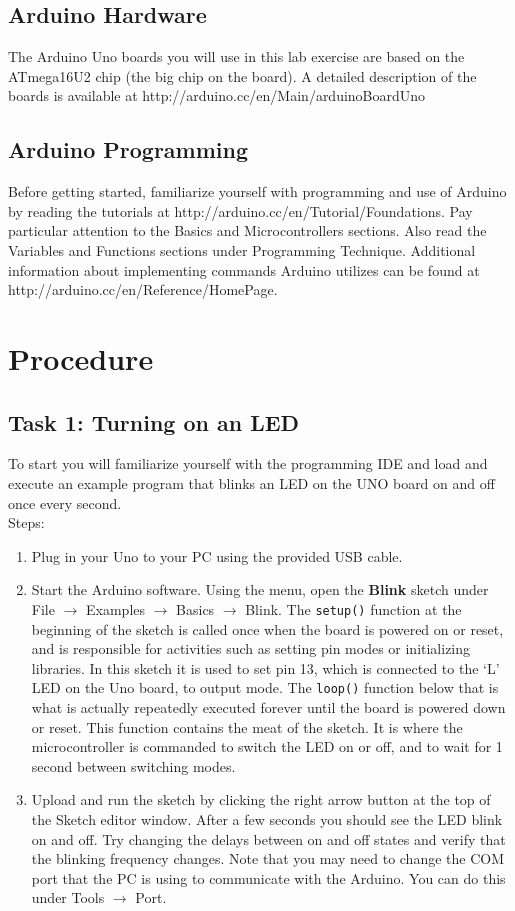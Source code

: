 \documentclass[12pt]{article}
\begin{document}
\subsection*{Arduino Hardware}
The Arduino Uno boards you will use in this lab exercise are based on the ATmega16U2 chip (the big chip on the board). 
A detailed description of the boards is available at
http://arduino.cc/en/Main/arduinoBoardUno

\subsection*{Arduino Programming}
Before getting started, familiarize yourself with programming and use of Arduino by reading the tutorials at
http://arduino.cc/en/Tutorial/Foundations. 
Pay particular attention to the Basics and Microcontrollers sections. 
Also read the Variables and Functions sections under Programming Technique.
Additional information about implementing commands Arduino utilizes can be found at http://arduino.cc/en/Reference/HomePage.

\section*{Procedure}
\subsection*{Task 1: Turning on an LED}
To start you will familiarize yourself with the programming IDE and 
load and execute an example program that blinks an LED on the UNO board on and off once every second.\\[1em]
Steps:
\begin{enumerate}
\item Plug in your Uno to your PC using the provided USB cable.
\item Start the Arduino software. 
Using the menu, open the {\bf Blink} sketch under File $\rightarrow$ Examples $\rightarrow$ Basics $\rightarrow$ Blink. 
The \texttt{setup()} function at the beginning of the sketch is called once when the board is powered on or reset, 
and is responsible for activities such as setting pin modes or initializing libraries. 
In this sketch it is used to set pin 13, which is connected to the `L' LED on the Uno board, to output mode.
The \texttt{loop()} function below that is what is actually repeatedly executed 
forever until the board is powered down or reset. 
This function contains the meat of the sketch. 
It is where the microcontroller is commanded to switch the LED on or off, 
and to wait for 1 second between switching modes.
\item Upload and run the sketch by clicking the right arrow button at the top of the Sketch editor window. 
After a few seconds you should see the LED blink on and off. 
Try changing the delays between on and off states and verify that the blinking frequency changes. 
Note that you may need to change the COM port that the PC is using to communicate with the Arduino. 
You can do this under Tools $\rightarrow$ Port.
\end{enumerate}
\end{document}
